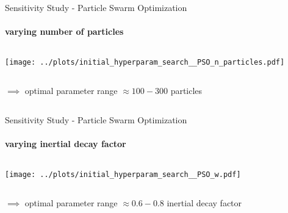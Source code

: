 \documentclass[11pt,aspectratio=169]{beamer}
\begin{document}
\begin{frame}{Sensitivity Study - Particle Swarm Optimization}
    \framesubtitle{varying \textbf{number of particles}}

    \begin{columns}
    \begin{column}{0.8\textwidth}
        \texttt{[image: ../plots/initial\_hyperparam\_search\_\_PSO\_n\_particles.pdf]}
    \end{column}
    \end{columns}

    \begin{columns}
        \begin{column}{0.8\textwidth}
            $\implies$ optimal parameter range $\approx 100-300$ particles
        \end{column}
        \begin{column}{0.1\textwidth}
            \tiny{}
        \end{column}
    \end{columns}
\end{frame}

%
%

\begin{frame}{Sensitivity Study - Particle Swarm Optimization}
    \framesubtitle{varying \textbf{inertial decay factor}}

    \begin{columns}
    \begin{column}{0.8\textwidth}
        \texttt{[image: ../plots/initial\_hyperparam\_search\_\_PSO\_w.pdf]}
    \end{column}
    \end{columns}

    \begin{columns}
        \begin{column}{0.8\textwidth}
            $\implies$ optimal parameter range $\approx 0.6 - 0.8$ inertial decay factor        \end{column}
        \begin{column}{0.1\textwidth}
            \tiny{}
        \end{column}
    \end{columns}
\end{frame}

%
%
\end{document}
